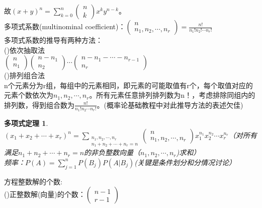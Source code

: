 \documentclass{book}%
\newtheorem{duoxiangshi}{多项式定理}
\begin{document}
	故$\displaystyle{(x+y)^{n}=\sum_{k=0}^{n}\begin{pmatrix}n\\k\end{pmatrix}x^{k}y^{n-k}}$。\\
	多项式系数(multinominal coefficient)：$\begin{pmatrix}n\\n_{1},n_{2},\cdots,n_{r}\end{pmatrix}=\frac{n!}{n_{1}!n_{2}!\cdots n_{r}!}$\\
	多项式系数的推导有两种方法：\\
	()依次抽取法\\
	$\begin{pmatrix}n\\n_{1}\end{pmatrix}\begin{pmatrix}n-n_{1}\\n_{2}\end{pmatrix}\cdots \begin{pmatrix}n-n_{1}-\cdots -n_{r-1}\\n_{r}\end{pmatrix}$\\
	()排列组合法\\
	n个元素分为r组，每组中的元素相同，即元素的可能取值有r个，每个取值对应的元素个数依次为$n_{1},n_{2},\cdots ,n_{r}$。所有元素任意排列排列数为n！，考虑排除同组内的排列数，得到组合数为$\frac{n!}{n_{1}!n_{2}\cdots n_{r}!}$。(概率论基础教程中对此推导方法的表述欠佳)\\
	\begin{duoxiangshi}
		$\displaystyle (x_{1}+x_{2}+\cdots +x_{r})^{n}=\sum_{\substack{n_{1},n_{2},\cdots,n_{r}\\n_{1}+n_{2}+\cdots +n_{r}=n}}\begin{pmatrix}n\\n_{1},n_{2},\cdots ,n_{r}\end{pmatrix}x_{1}^{n_{1}}x_{2}^{n_{2}}\cdots x_{r}^{n_{r}}$（对所有满足$n_{1}+n_{2}+\cdots +n_{r}=n$的非负整数向量（$n_{1},n_{2},\cdots ,n_{r}$)求和）\\
		频率：$P(A)=\sum\limits_{j=1}^{n}P(B_{j})P(A|B_{j})$(关键是条件划分和分情况讨论）
	\end{duoxiangshi}
	方程整数解的个数:\\
	()正整数解(向量)的个数：$\begin{pmatrix}n-1\\r-1\end{pmatrix}$\\
\end{document}

